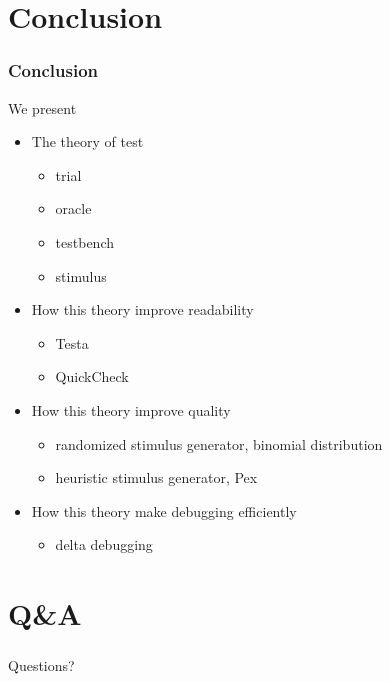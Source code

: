 \documentclass[lualatex]{beamer}
\begin{document}
\section{Conclusion}

\begin{frame}
  \frametitle{Conclusion}

  \begin{block}{We present}
    \begin{itemize}
    \item The theory of test
      \begin{itemize}
      \item trial
      \item oracle
      \item testbench
      \item stimulus
      \end{itemize}
      \pause
    \item How this theory improve readability
      \begin{itemize}
      \item Testa
      \item QuickCheck
      \end{itemize}
      \pause
    \item How this theory improve quality
      \begin{itemize}
      \item randomized stimulus generator, binomial distribution
      \item heuristic stimulus generator, Pex
      \end{itemize}
      \pause
    \item How this theory make debugging efficiently
      \begin{itemize}
      \item delta debugging
      \end{itemize}
    \end{itemize}
  \end{block}
\end{frame}

\section{Q\&A}

\begin{frame}
  \frametitle{}
  \begin{center}
    \Huge
    Questions?
  \end{center}
\end{frame}
\end{document}
